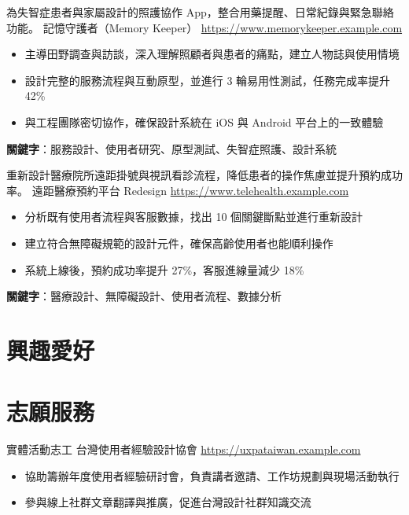 \documentclass[a4paper, serif, 10pt]{moderncv}
\begin{document}
        {為失智症患者與家屬設計的照護協作 App，整合用藥提醒、日常紀錄與緊急聯絡功能。}
        {記憶守護者（Memory Keeper）}
        {\url{https://www.memorykeeper.example.com}}
        {}
        {\begin{itemize}
\item 主導田野調查與訪談，深入理解照顧者與患者的痛點，建立人物誌與使用情境
\item 設計完整的服務流程與互動原型，並進行 3 輪易用性測試，任務完成率提升 42\%
\item 與工程團隊密切協作，確保設計系統在 iOS 與 Android 平台上的一致體驗
\end{itemize}
\textbf{關鍵字}：服務設計、使用者研究、原型測試、失智症照護、設計系統}

        {重新設計醫療院所遠距掛號與視訊看診流程，降低患者的操作焦慮並提升預約成功率。}
        {遠距醫療預約平台 Redesign}
        {\url{https://www.telehealth.example.com}}
        {}
        {\begin{itemize}
\item 分析既有使用者流程與客服數據，找出 10 個關鍵斷點並進行重新設計
\item 建立符合無障礙規範的設計元件，確保高齡使用者也能順利操作
\item 系統上線後，預約成功率提升 27\%，客服進線量減少 18\%
\end{itemize}
\textbf{關鍵字}：醫療設計、無障礙設計、使用者流程、數據分析}
\section{興趣愛好}

\section{志願服務}

        {實體活動志工}
        {台灣使用者經驗設計協會}
        {\url{https://uxpataiwan.example.com}}
        {}
        {\begin{itemize}
\item 協助籌辦年度使用者經驗研討會，負責講者邀請、工作坊規劃與現場活動執行
\item 參與線上社群文章翻譯與推廣，促進台灣設計社群知識交流
\end{itemize}}
\end{document}
